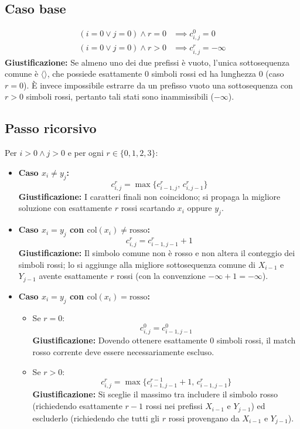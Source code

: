 \subsection{Caso base}
\begin{align*}
    (i = 0 \lor j = 0) \land r = 0 &\implies c_{i,j}^0 = 0 \\
    (i = 0 \lor j = 0) \land r > 0 &\implies c_{i,j}^r = -\infty
\end{align*}
\textbf{Giustificazione:} Se almeno uno dei due prefissi è vuoto, l'unica sottosequenza comune è $\langle \rangle$, che possiede esattamente $0$ simboli rossi ed ha lunghezza $0$ (caso $r=0$). È invece impossibile estrarre da un prefisso vuoto una sottosequenza con $r > 0$ simboli rossi, pertanto tali stati sono inammissibili ($-\infty$).

\subsection{Passo ricorsivo}
Per $i > 0 \land j > 0$ e per ogni $r \in \{0, 1, 2, 3\}$:
\begin{itemize}
    \item \textbf{Caso $x_i \neq y_j$:}
    \[
        c_{i,j}^r = \max \{ c_{i-1, j}^r, \, c_{i, j-1}^r \}
    \]
    \textbf{Giustificazione:} I caratteri finali non coincidono; si propaga la migliore soluzione con esattamente $r$ rossi scartando $x_i$ oppure $y_j$.

    \item \textbf{Caso $x_i = y_j$ con $\text{col}(x_i) \neq \text{rosso}$:}
    \[
        c_{i,j}^r = c_{i-1, j-1}^r + 1
    \]
    \textbf{Giustificazione:} Il simbolo comune non è rosso e non altera il conteggio dei simboli rossi; lo si aggiunge alla migliore sottosequenza comune di $X_{i-1}$ e $Y_{j-1}$ avente esattamente $r$ rossi (con la convenzione $-\infty + 1 = -\infty$).

    \item \textbf{Caso $x_i = y_j$ con $\text{col}(x_i) = \text{rosso}$:}
    \begin{itemize}
        \item Se $r = 0$:
        \[
            c_{i,j}^0 = c_{i-1, j-1}^0
        \]
        \textbf{Giustificazione:} Dovendo ottenere esattamente $0$ simboli rossi, il match rosso corrente deve essere necessariamente escluso.
        \item Se $r > 0$:
        \[
            c_{i,j}^r = \max \{ c_{i-1, j-1}^{r-1} + 1, \, c_{i-1, j-1}^r \}
        \]
        \textbf{Giustificazione:} Si sceglie il massimo tra includere il simbolo rosso (richiedendo esattamente $r-1$ rossi nei prefissi $X_{i-1}$ e $Y_{j-1}$) ed escluderlo (richiedendo che tutti gli $r$ rossi provengano da $X_{i-1}$ e $Y_{j-1}$).
    \end{itemize}
\end{itemize}

